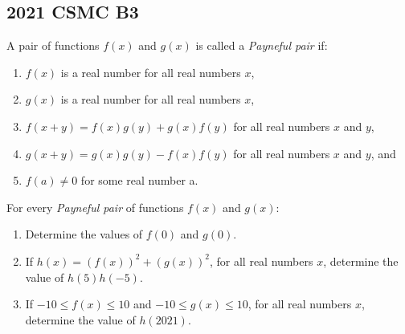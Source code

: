 \documentclass{article}
\begin{document}
\subsection{2021 CSMC B3}
A pair of functions $f(x)$ and $g(x)$ is called a \emph{Payneful pair} if:
\begin{enumerate}[label=(\roman*)]
    \item $f(x)$ is a real number for all real numbers $x$,
    \item $g(x)$ is a real number for all real numbers $x$,
    \item $f(x + y) = f(x)g(y) + g(x)f(y)$ for all real numbers $x$ and $y$,
    \item $g(x + y) = g(x)g(y) - f(x)f(y)$ for all real numbers $x$ and $y$, and
    \item $f(a) \neq 0$ for some real number a.
\end{enumerate}
\vspace{20px}
For every \emph{Payneful pair} of functions $f(x)$ and $g(x)$:
\begin{enumerate}[label=(\alph*)]
    \item Determine the values of $f(0)$ and $g(0)$.
    \item If $h(x) = (f(x))^2 + (g(x))^2$, for all real numbers $x$, determine the value of $h(5)h(-5)$.
    \item If $-10 \le f(x) \le 10$ and $-10 \le g(x) \le 10$, for all real numbers $x$, determine the value of $h(2021)$.
\end{enumerate}
\pagebreak
\end{document}
